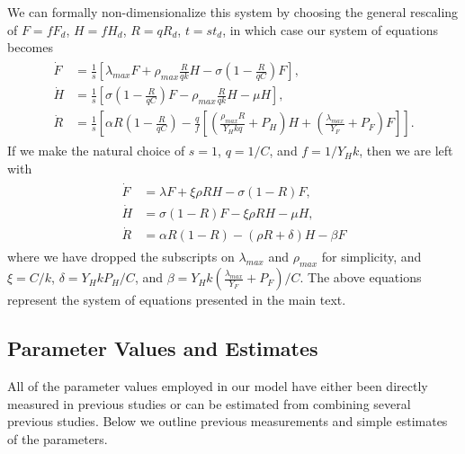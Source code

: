 \documentclass[twocolumn,preprintnumbers,amsmath,amssymb,superscriptaddress]{revtex4}
\begin{document}
\begin{bibunit}[unsrt]
We can formally non-dimensionalize this system by choosing the general rescaling of $F=fF_{d}$, $H=fH_{d}$, $R=qR_{d}$, $t=st_{d}$, in which case our system of equations becomes
\begin{align}
\begin{split}
\dot{F} &= \frac{1}{s}\left[\lambda_{max} F + \rho_{max}\frac{R}{qk}H - \sigma \left(1-\frac{R}{qC}\right)F\right],  \\
\dot{H} &= \frac{1}{s}\left[\sigma \left(1-\frac{R}{qC}\right)F - \rho_{max}\frac{R}{qk} H - \mu H\right],  \\
\dot{R} &= \frac{1}{s}\left[\alpha R\left(1-\frac{R}{qC}\right) -\frac{q}{f}\left[\left(\frac{\rho_{max}R}{Y_{H}kq}+P_{H}\right)H+\left(\frac{\lambda_{max}}{Y_{F}}+P_{F}\right) F\right]\right].
\end{split}
\end{align}
If we make the natural choice of $s=1$, $q=1/C$, and $f=1/Y_{H}k$, then we are left with
\begin{align}
\begin{split}
\dot{F} &= \lambda F + \xi \rho RH - \sigma \left(1-R\right)F,  \\
\dot{H} &= \sigma \left(1-R\right)F - \xi \rho RH - \mu H,  \\
\dot{R} &= \alpha R\left(1-R\right) -\left(\rho R+\delta\right)H-\beta F
\end{split}
\end{align}
where we have dropped the subscripts on $\lambda_{max}$ and $\rho_{max}$ for simplicity, and $\xi=C/k$, $\delta=Y_{H}kP_{H}/C$, and $\beta=Y_{H}k\left(\frac{\lambda_{max}}{Y_{F}}+P_{F}\right)/C$. The above equations represent the system of equations presented in the main text.

\subsection*{Parameter Values and Estimates}


All of the parameter values employed in our model have either been directly measured in previous studies or can be estimated from combining several previous studies. Below we outline previous measurements and simple estimates of the parameters.


\end{bibunit}
\end{document}
